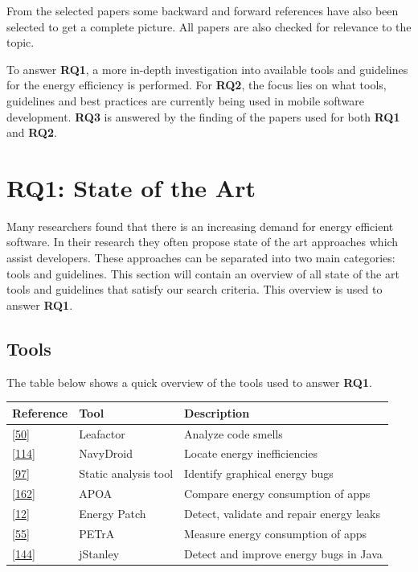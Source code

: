 \documentclass[]{book}
\begin{document}
From the selected papers some backward and forward references have also
been selected to get a complete picture. All papers are also checked for
relevance to the topic.

To answer \textbf{RQ1}, a more in-depth investigation into available
tools and guidelines for the energy efficiency is performed. For
\textbf{RQ2}, the focus lies on what tools, guidelines and best
practices are currently being used in mobile software development.
\textbf{RQ3} is answered by the finding of the papers used for both
\textbf{RQ1} and \textbf{RQ2}.

\section{RQ1: State of the Art}\label{rq1-state-of-the-art}

Many researchers found that there is an increasing demand for energy
efficient software. In their research they often propose state of the
art approaches which assist developers. These approaches can be
separated into two main categories: tools and guidelines. This section
will contain an overview of all state of the art tools and guidelines
that satisfy our search criteria. This overview is used to answer
\textbf{RQ1}.

\subsection{Tools}\label{tools}

The table below shows a quick overview of the tools used to answer
\textbf{RQ1}.

\begin{longtable}[]{@{}lll@{}}
\toprule
Reference & Tool & Description\tabularnewline
\midrule
\endhead
{[}\protect\hyperlink{ref-CA2018}{50}{]} & Leafactor & Analyze code
smells\tabularnewline
{[}\protect\hyperlink{ref-LWXM2017}{114}{]} & NavyDroid & Locate energy
inefficiencies\tabularnewline
{[}\protect\hyperlink{ref-KKK2016}{97}{]} & Static analysis tool &
Identify graphical energy bugs\tabularnewline
{[}\protect\hyperlink{ref-SKHA2018}{162}{]} & APOA & Compare energy
consumption of apps\tabularnewline
{[}\protect\hyperlink{ref-BCBR2017}{12}{]} & Energy Patch & Detect,
validate and repair energy leaks\tabularnewline
{[}\protect\hyperlink{ref-NPPPZL2017B}{55}{]} & PETrA & Measure energy
consumption of apps\tabularnewline
{[}\protect\hyperlink{ref-PSCS2018}{144}{]} & jStanley & Detect and
improve energy bugs in Java\tabularnewline
\bottomrule
\end{longtable}
\end{document}
